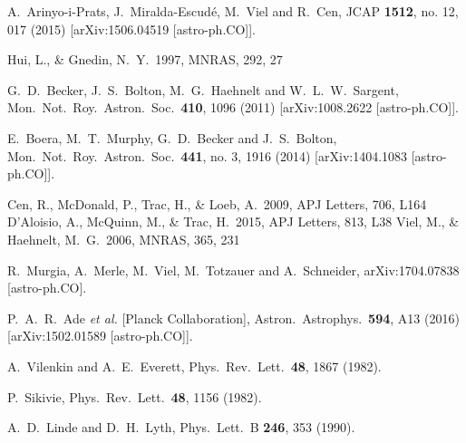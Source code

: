 \documentclass[11pt,nofootinbib]{article}
\numberwithin{equation}{section}
\begin{document}
\begin{thebibliography}{99}
  A.~Arinyo-i-Prats, J.~Miralda-Escudé, M.~Viel and R.~Cen,
  JCAP {\bf 1512}, no. 12, 017 (2015)
  [arXiv:1506.04519 [astro-ph.CO]].
	
 Hui, L., \& Gnedin, N.~Y.\ 1997, MNRAS, 292, 27 

  G.~D.~Becker, J.~S.~Bolton, M.~G.~Haehnelt and W.~L.~W.~Sargent,
  Mon.\ Not.\ Roy.\ Astron.\ Soc.\  {\bf 410}, 1096 (2011)
  [arXiv:1008.2622 [astro-ph.CO]].

  E.~Boera, M.~T.~Murphy, G.~D.~Becker and J.~S.~Bolton,
  Mon.\ Not.\ Roy.\ Astron.\ Soc.\  {\bf 441}, no. 3, 1916 (2014)
  [arXiv:1404.1083 [astro-ph.CO]].
	
 Cen, R., McDonald, P., Trac, H., \& Loeb, A.\ 2009, APJ Letters, 706, L164 
 D'Aloisio, A., McQuinn, M., \& Trac, H.\ 2015, APJ Letters,  813, L38 
 Viel, M., \& Haehnelt, M.~G.\ 2006, MNRAS, 365, 231 
	
  R.~Murgia, A.~Merle, M.~Viel, M.~Totzauer and A.~Schneider,
  arXiv:1704.07838 [astro-ph.CO].    
	
  P.~A.~R.~Ade {\it et al.} [Planck Collaboration],
  Astron.\ Astrophys.\  {\bf 594}, A13 (2016)
  [arXiv:1502.01589 [astro-ph.CO]].	

  A.~Vilenkin and A.~E.~Everett,
  Phys.\ Rev.\ Lett.\  {\bf 48}, 1867 (1982).

  P.~Sikivie,
  Phys.\ Rev.\ Lett.\  {\bf 48}, 1156 (1982).

  A.~D.~Linde and D.~H.~Lyth,
  Phys.\ Lett.\ B {\bf 246}, 353 (1990).


\end{thebibliography}
\end{document}
